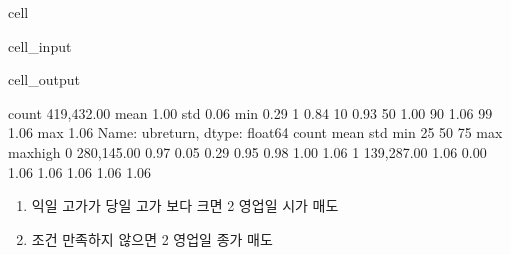 \documentclass[letterpaper,10pt,english]{jupyterBook}
\begin{document}
\begin{sphinxuseclass}{cell}\begin{sphinxVerbatimInput}

\begin{sphinxuseclass}{cell_input}
\begin{sphinxVerbatim}[commandchars=\\\{\}]
  
\PYG{p}{[}\PYG{p}{]}\PYG{p}{[}    \PYG{p}{]}
\PYG{p}{[}\PYG{p}{]}
\end{sphinxVerbatim}

\end{sphinxuseclass}\end{sphinxVerbatimInput}
\begin{sphinxVerbatimOutput}

\begin{sphinxuseclass}{cell_output}
\begin{sphinxVerbatim}[commandchars=\\\{\}]
count   419,432.00
mean          1.00
std           0.06
min           0.29
1\PYGZpc{}            0.84
10\PYGZpc{}           0.93
50\PYGZpc{}           1.00
90\PYGZpc{}           1.06
99\PYGZpc{}           1.06
max           1.06
Name: ub\PYGZus{}return, dtype: float64
              count  mean  std  min  25\PYGZpc{}  50\PYGZpc{}  75\PYGZpc{}  max
max\PYGZus{}high                                               
0        280,145.00  0.97 0.05 0.29 0.95 0.98 1.00 1.06
1        139,287.00  1.06 0.00 1.06 1.06 1.06 1.06 1.06
\end{sphinxVerbatim}

\end{sphinxuseclass}\end{sphinxVerbatimOutput}

\end{sphinxuseclass}
\sphinxAtStartPar
\begin{enumerate}
%
\item {} 
\sphinxAtStartPar
익일 고가가 당일 고가 보다 크면 2 영업일 시가 매도

\item {} 
 조건 만족하지 않으면 2 영업일 종가 매도

\end{enumerate}
\end{document}
